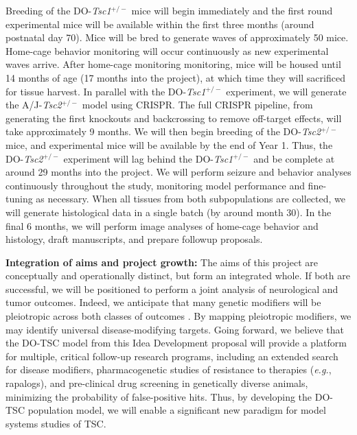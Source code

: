 \documentclass[
  12pt,
]{article}
\begin{document}
Breeding of the DO-\textit{Tsc1}\(^{+/-}\) mice will begin immediately
and the first round experimental mice will be available within the first
three months (around postnatal day 70). Mice will be bred to generate
waves of approximately 50 mice. Home-cage behavior monitoring will occur
continuously as new experimental waves arrive. After home-cage
monitoring monitoring, mice will be housed until 14 months of age (17
months into the project), at which time they will sacrificed for tissue
harvest. In parallel with the DO-\textit{Tsc1}\(^{+/-}\) experiment, we
will generate the A/J-\textit{Tsc2}\(^{+/-}\) model using CRISPR. The
full CRISPR pipeline, from generating the first knockouts and
backcrossing to remove off-target effects, will take approximately 9
months. We will then begin breeding of the DO-\textit{Tsc2}\(^{+/-}\)
mice, and experimental mice will be available by the end of Year 1.
Thus, the DO-\textit{Tsc2}\(^{+/-}\) experiment will lag behind the
DO-\textit{Tsc1}\(^{+/-}\) and be complete at around 29 months into the
project. We will perform seizure and behavior analyses continuously
throughout the study, monitoring model performance and fine-tuning as
necessary. When all tissues from both subpopulations are collected, we
will generate histological data in a single batch (by around month 30).
In the final 6 months, we will perform image analyses of home-cage
behavior and histology, draft manuscripts, and prepare followup
proposals.

\textbf{Integration of aims and project growth:} The aims of this
project are conceptually and operationally distinct, but form an
integrated whole. If both are successful, we will be positioned to
perform a joint analysis of neurological and tumor outcomes. Indeed, we
anticipate that many genetic modifiers will be pleiotropic across both
classes of outcomes \cite{28592500}. By mapping pleiotropic modifiers,
we may identify universal disease-modifying targets. Going forward, we
believe that the DO-TSC model from this Idea Development proposal will
provide a platform for multiple, critical follow-up research programs,
including an extended search for disease modifiers, pharmacogenetic
studies of resistance to therapies (\textit{e.g.}, rapalogs), and
pre-clinical drug screening in genetically diverse animals, minimizing
the probability of false-positive hits. Thus, by developing the DO-TSC
population model, we will enable a significant new paradigm for model
systems studies of TSC.

\pagebreak


\end{document}
